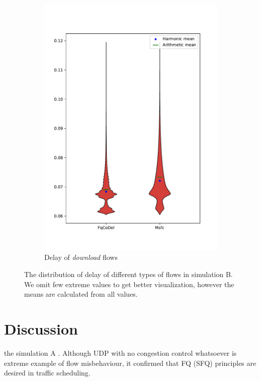 \begin{figure}
\begin{subfigure}[b]{0.475\textwidth}
		\includegraphics[width=\textwidth]{drawings/type5-delay-down_B}
		\caption[]%
		{{\small Delay of \emph{download} flows}}    
		\label{fig:delay_download_B}
	\end{subfigure}
	\caption[]
	{\small The distribution of delay of different types of flows in simulation B. We omit few extreme values to get better visualization, however the means are calculated from all values.} 
	\label{fig:delay_flows_B}
\end{figure}



\section{Discussion}

 the  simulation A  . Although UDP with no congestion control whatsoever is extreme example of flow misbehaviour, it confirmed that FQ (SFQ) principles are desired in traffic scheduling. 

